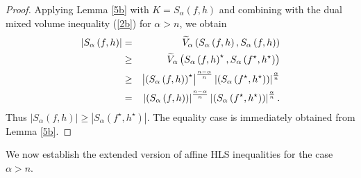 \documentclass[preprint,12pt]{elsarticle}
\begin{document}
\begin{proof}
Applying Lemma \ref{5b} with $K=S_{\alpha }\left ( f,h \right ) $ and combining with the dual mixed volume inequality (\ref{2b}) for $\alpha > n$, we obtain
\begin{eqnarray}
\left | S_{\alpha }\left ( f,h \right )   \right | &=&\widetilde{V}_{\alpha }\left (S_{\alpha }\left ( f,h \right ),S_{\alpha }\left ( f,h \right ) \right )\notag\\
&\ge&  \widetilde{V}_{\alpha }\left (S_{\alpha }\left ( f,h \right )^{\star } ,S_{\alpha }\left ( f^{\star } ,h^{\star }  \right ) \right )\notag\\
&\ge&\left | \left ( S_{\alpha }\left ( f,h \right )    \right )^{\star }   \right |^{\frac{n-\alpha }{n}}\left | \left ( S_{\alpha }\left ( f^{\star } ,h^{\star }  \right )    \right )  \right |^{\frac{\alpha }{n}}\notag\\
&=&  \left | \left ( S_{\alpha }\left ( f,h \right )    \right )   \right |^{\frac{n-\alpha }{n}}\left | \left ( S_{\alpha }\left ( f^{\star }  ,h^{\star } \right )    \right )  \right |^{\frac{\alpha }{n}}.\notag 
\end{eqnarray}
Thus $\left | S_{\alpha }\left ( f,h \right )   \right |\ge\left | S_{\alpha }\left ( f^{\star } ,h^{\star }  \right )   \right |$.
The equality case is immediately obtained from Lemma \ref{5b}.
\end{proof}
We now establish the extended version of affine HLS inequalities for the case $\alpha > n$.
\end{document}
